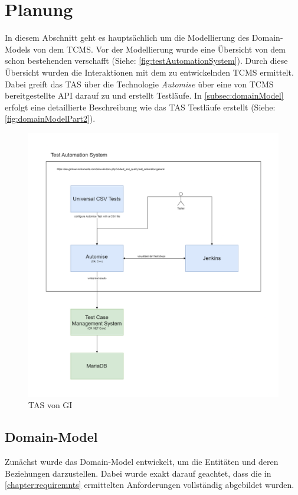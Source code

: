 \documentclass[a4paper, fontsize=11pt, parskip=half, twoside]{scrreprt}
\begin{document}
	
	\section{Planung}
	In diesem Abschnitt geht es hauptsächlich um die Modellierung des Domain-Models von dem \ac{TCMS}.
	Vor der Modellierung wurde eine Übersicht von dem schon bestehenden  verschafft (Siehe: \autoref{fig:testAutomationSystem}).
	Durch diese Übersicht wurden die Interaktionen mit dem zu entwickelnden \ac{TCMS} ermittelt.
	Dabei greift das \ac{TAS} über die Technologie \emph{Automise} über eine von \ac{TCMS} bereitgestellte \ac{API} darauf zu und erstellt Testläufe.
	In \autoref{subsec:domainModel} erfolgt eine detaillierte Beschreibung wie das \ac{TAS} Testläufe erstellt (Siehe: \autoref{fig:domainModelPart2}).
	
	\begin{figure}[ht]
		\centering
		\includegraphics[scale=0.3]{assets/TestTechnologiesOverview.drawio.png}
		\caption{\ac{TAS} von \ac{GI}}
		\label{fig:testAutomationSystem}
	\end{figure}
	
	\subsection{Domain-Model} \label{subsec:domainModel}
	Zunächst wurde das Domain-Model entwickelt, um die Entitäten und deren Beziehungen darzustellen.
	Dabei wurde exakt darauf geachtet, dass die in \autoref{chapter:requiremnts} ermittelten Anforderungen vollständig abgebildet wurden.
\end{document}
